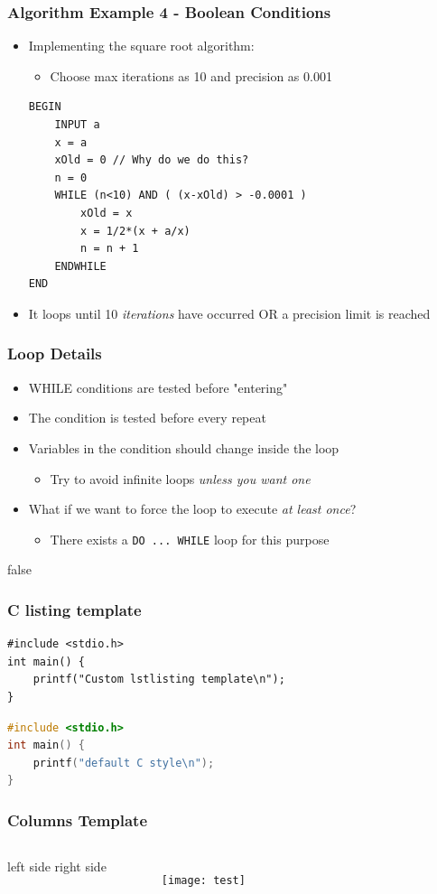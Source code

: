 \documentclass[14pt]{beamer}
\begin{document}
\begin{frame}[fragile]
\frametitle{Algorithm Example 4 - Boolean Conditions}
\begin{itemize}
\item Implementing the square root algorithm:
	\begin{itemize}
		\item Choose max iterations as 10 and precision as 0.001
	\end{itemize}

\begin{lstlisting}[style=pseudo,mathescape=true,basicstyle=\ttfamily\scriptsize]
BEGIN
	INPUT a
	x = a
	xOld = 0 // Why do we do this?
	n = 0
	WHILE (n<10) AND ( (x-xOld) > -0.0001 )
		xOld = x
		x = 1/2*(x + a/x)
		n = n + 1
	ENDWHILE 
END
\end{lstlisting}

\item It loops until 10 \textit{iterations} have occurred OR a precision limit is reached
\end{itemize}
\end{frame}

\begin{frame}
\frametitle{Loop Details}
\begin{itemize}
\item WHILE conditions are tested before "entering"
\item The condition is tested before every repeat
\item Variables in the condition should change inside the loop
	\begin{itemize}
		\item Try to avoid infinite loops \textit{unless you want one}
	\end{itemize}
\item What if we want to force the loop to execute \textit{at least once}?
	\begin{itemize}
		\item There exists a \texttt{DO ... WHILE} loop for this purpose
	\end{itemize}
\end{itemize}
\end{frame}

\if false
\begin{frame}[fragile] %
\frametitle{C listing template}
\begin{lstlisting}[style=CStyle]
#include <stdio.h>
int main() {
	printf("Custom lstlisting template\n");
}
\end{lstlisting}

\begin{lstlisting}[language=c]
#include <stdio.h>
int main() {
	printf("default C style\n");
}
\end{lstlisting}
\end{frame}

\begin{frame}
\frametitle{Columns Template}
\begin{columns}
\column{1.5in}
left side
\column{1.5in}
right side
\begin{figure}
\texttt{[image: test]}
\end{figure}
\end{columns}
\end{frame}
\fi

\fi
\end{document}
